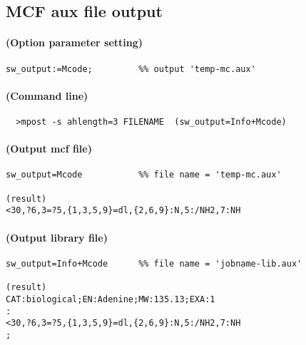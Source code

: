 \documentclass[a4paper]{article}
\begin{document}
\subsection{MCF aux file output}
\paragraph{(Option parameter setting)}
%
\begin{verbatim}
sw_output:=Mcode;         %% output 'temp-mc.aux'
\end{verbatim}
\paragraph{(Command line)}
\begin{verbatim}
  >mpost -s ahlength=3 FILENAME  (sw_output=Info+Mcode)
\end{verbatim}
\paragraph{(Output mcf file)}
\begin{verbatim}
sw_output=Mcode           %% file name = 'temp-mc.aux'

(result)
<30,?6,3=?5,{1,3,5,9}=dl,{2,6,9}:N,5:/NH2,7:NH

\end{verbatim}
\paragraph{(Output library file)}
\begin{verbatim}
sw_output=Info+Mcode      %% file name = 'jobname-lib.aux'

(result)
CAT:biological;EN:Adenine;MW:135.13;EXA:1
:
<30,?6,3=?5,{1,3,5,9}=dl,{2,6,9}:N,5:/NH2,7:NH
;

\end{verbatim}
\end{document}
